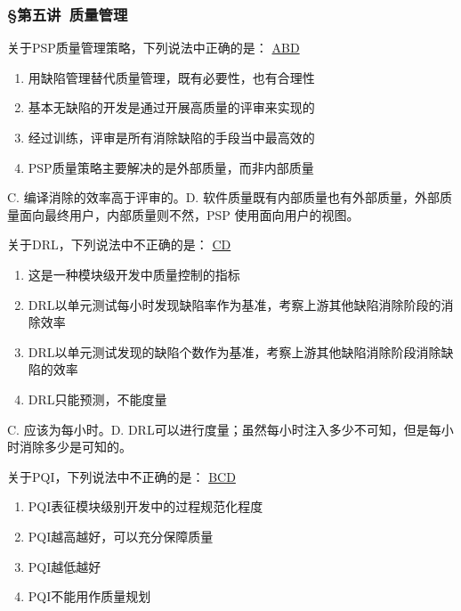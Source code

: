 \subsubsection*{\S 第五讲\ 质量管理}
\setcounter{problemname}{0}

\begin{problem}
	关于PSP质量管理策略，下列说法中正确的是：
	\uline{ABD}
        \begin{enumerate}[label=\Alph*.]
            \item 用缺陷管理替代质量管理，既有必要性，也有合理性
            \item 基本无缺陷的开发是通过开展高质量的评审来实现的
            \item 经过训练，评审是所有消除缺陷的手段当中最高效的
            \item PSP质量策略主要解决的是外部质量，而非内部质量
        \end{enumerate}
\end{problem}

\begin{solution}
C. 编译消除的效率高于评审的。D. 软件质量既有内部质量也有外部质量，外部质量面向最终用户，内部质量则不然，PSP 使用面向用户的视图。
\end{solution}




\begin{problem}
	关于DRL，下列说法中不正确的是：
	\uline{CD}
        \begin{enumerate}[label=\Alph*.]
            \item 这是一种模块级开发中质量控制的指标
            \item DRL以单元测试每小时发现缺陷率作为基准，考察上游其他缺陷消除阶段的消除效率
            \item DRL以单元测试发现的缺陷个数作为基准，考察上游其他缺陷消除阶段消除缺陷的效率
            \item DRL只能预测，不能度量
        \end{enumerate}
\end{problem}

\begin{solution}
C. 应该为每小时。D. DRL可以进行度量；虽然每小时注入多少不可知，但是每小时消除多少是可知的。
\end{solution}



\begin{problem}
	关于PQI，下列说法中不正确的是：
	\uline{BCD}    
    \vspace{-0.8em}
    \begin{multicols}{2}
        \begin{enumerate}[label=\Alph*.]
            \item PQI表征模块级别开发中的过程规范化程度
            \item PQI越高越好，可以充分保障质量
            \item PQI越低越好
            \item PQI不能用作质量规划
        \end{enumerate}
    \end{multicols}
    \vspace{-1em}
\end{problem}




